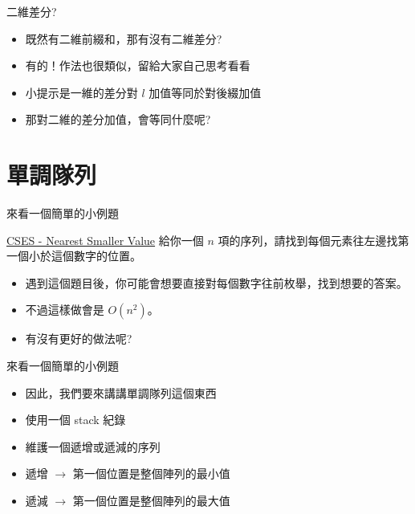 \documentclass[aspectratio=169]{beamer}
\begin{document}
    \begin{frame}{二維差分?}
        \begin{itemize}
            \item 既然有二維前綴和，那有沒有二維差分?
            \item 有的！作法也很類似，留給大家自己思考看看
            \item<2-> 小提示是一維的差分對 $l$ 加值等同於對後綴加值
            \item<2-> 那對二維的差分加值，會等同什麼呢?
        \end{itemize}
    \end{frame}
    
    \section{單調隊列}
    
    \begin{frame}{來看一個簡單的小例題}
        \begin{block}{\href{https://cses.fi/problemset/task/1645/}{CSES - Nearest Smaller Value}}
            給你一個 $n$ 項的序列，請找到每個元素往左邊找第一個小於這個數字的位置。
        \end{block}
        \begin{itemize}
            \item<2-> 遇到這個題目後，你可能會想要直接對每個數字往前枚舉，找到想要的答案。
            \item<2-> 不過這樣做會是 $O(n^2)$。
            \item<3-> 有沒有更好的做法呢?
        \end{itemize}
    \end{frame}
    
    \begin{frame}{來看一個簡單的小例題}
        \begin{itemize}
            \item 因此，我們要來講講單調隊列這個東西
            \item 使用一個 stack 紀錄
            \item 維護一個遞增或遞減的序列
            \item 遞增 $\rightarrow$ 第一個位置是整個陣列的最小值
            \item 遞減 $\rightarrow$ 第一個位置是整個陣列的最大值
        \end{itemize}
    \end{frame}
    
\end{document}
